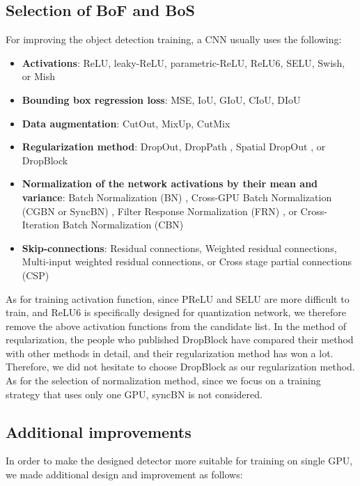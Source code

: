 \documentclass[10pt,twocolumn,letterpaper]{article}
\begin{document}
\subsection{Selection of BoF and BoS}

For improving the object detection training, a CNN usually uses the following:

\begin{itemize}
	\item \textbf{Activations}: ReLU, leaky-ReLU, parametric-ReLU, ReLU6, SELU, Swish, or Mish
	\item \textbf{Bounding box regression loss}: MSE, IoU, GIoU, CIoU, DIoU
	\item \textbf{Data augmentation}: CutOut, MixUp, CutMix
	\item \textbf{Regularization method}: DropOut, DropPath \cite{larsson2016fractalnet}, Spatial DropOut \cite{tompson2015efficient}, or DropBlock
	\item \textbf{Normalization of the network activations by their mean and variance}: Batch Normalization (BN) \cite{ioffe2015batch}, Cross-GPU Batch Normalization (CGBN or SyncBN) \cite{zhang2018context}, Filter Response Normalization (FRN) \cite{singh2019filter}, or Cross-Iteration Batch Normalization (CBN) \cite{yao2020cross}
	\item \textbf{Skip-connections}: Residual connections, Weighted residual connections, Multi-input weighted residual connections, or Cross stage partial connections (CSP)
\end{itemize}

As for training activation function, since PReLU and SELU are more difficult to train, and ReLU6 is specifically designed for quantization network, we therefore remove the above activation functions from the candidate list. In the method of reqularization, the people who published DropBlock have compared their method with other methods in detail, and their regularization method has won a lot. Therefore, we did not hesitate to choose DropBlock as our regularization method. As for the selection of normalization method, since we focus on a training strategy that uses only one GPU, syncBN is not considered.

\subsection{Additional improvements}

In order to make the designed detector more suitable for training on single GPU, we made additional design and improvement as follows:
\end{document}
